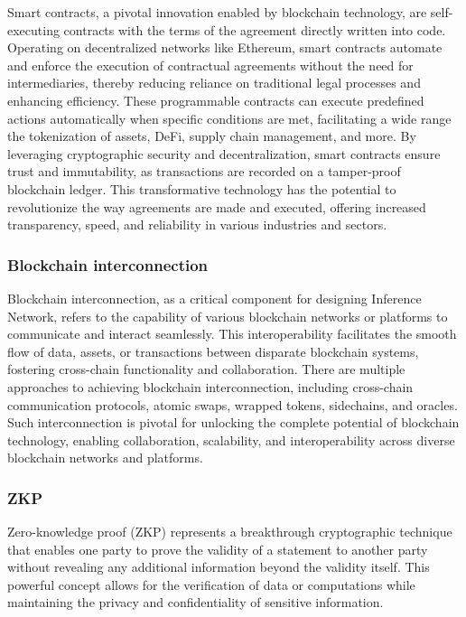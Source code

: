 \documentclass[conference]{IEEEtran}
\begin{document}
Smart contracts, a pivotal innovation enabled by blockchain technology, are self-executing contracts with the terms of the agreement directly written into code. Operating on decentralized networks like Ethereum, smart contracts automate and enforce the execution of contractual agreements without the need for intermediaries, thereby reducing reliance on traditional legal processes and enhancing efficiency.  These programmable contracts can execute predefined actions automatically when specific conditions are met, facilitating a wide range the tokenization of assets, DeFi, supply chain management, and more.  By leveraging cryptographic security and decentralization, smart contracts ensure trust and immutability, as transactions are recorded on a tamper-proof blockchain ledger. This transformative technology has the potential to revolutionize the way agreements are made and executed, offering increased transparency, speed, and reliability in various industries and sectors.

\subsubsection{Blockchain interconnection}

Blockchain interconnection, as a critical component for designing Inference Network, refers to the capability of various blockchain networks or platforms to communicate and interact seamlessly. This interoperability facilitates the smooth flow of data, assets, or transactions between disparate blockchain systems, fostering cross-chain functionality and collaboration. There are multiple approaches to achieving blockchain interconnection, including cross-chain communication protocols, atomic swaps, wrapped tokens, sidechains, and oracles. Such interconnection is pivotal for unlocking the complete potential of blockchain technology, enabling collaboration, scalability, and interoperability across diverse blockchain networks and platforms.

\subsubsection{ZKP}

Zero-knowledge proof (ZKP) represents a breakthrough cryptographic technique that enables one party to prove the validity of a statement to another party without revealing any additional information beyond the validity itself. This powerful concept allows for the verification of data or computations while maintaining the privacy and confidentiality of sensitive information.
\end{document}
